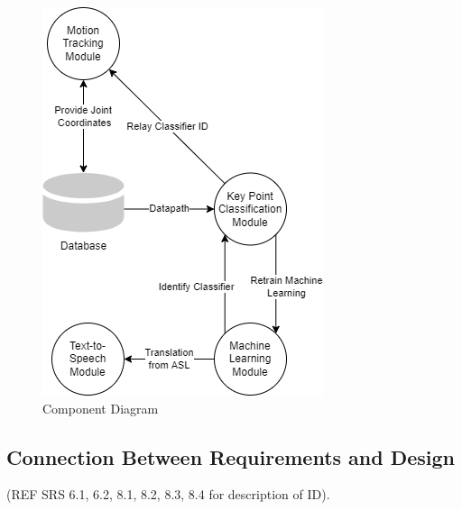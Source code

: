 \documentclass[12pt, titlepage]{article}
\begin{document}
\begin{figure}[H] 
\centering
\includegraphics[width=\textwidth,height=0.88\textheight,keepaspectratio]{ComponentDiagram.jpg} 
\caption{Component Diagram} 
\label{Fig.Component_Diagram} 
\end{figure}

\subsection{Connection Between Requirements and Design} \label{SecConnection}
(REF SRS 6.1, 6.2, 8.1, 8.2, 8.3, 8.4 for description of ID).
\end{document}
